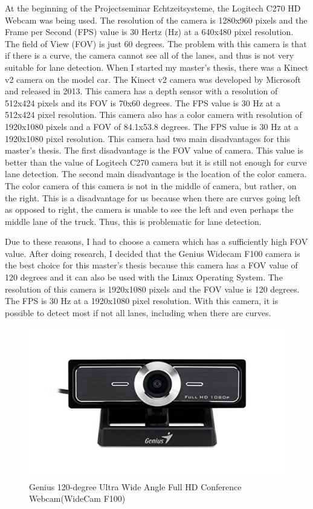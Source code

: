 At the beginning of the Projectseminar Echtzeitsysteme, the Logitech C270 HD Webcam was being used. The resolution of 
the camera is 1280x960 pixels and the Frame per Second (FPS) value is 30 Hertz (Hz) at a 640x480 pixel resolution. 
The field of View (FOV) is just 60 degrees. The problem with this camera is that if there is a curve, the camera 
cannot see all of the lanes, and thus is not very suitable for lane detection. When I started my master's thesis, there 
was a Kinect v2 camera on the model car.  The Kinect v2 camera was developed by Microsoft and released in 2013. This 
camera has a depth sensor with a resolution of 512x424 pixels and its FOV is 70x60 degrees. The FPS value is 30 Hz at 
a 512x424 pixel resolution. This camera also has a color camera with resolution of 1920x1080 pixels and a FOV of 
84.1x53.8 degrees. The FPS value is 30 Hz at a 1920x1080 pixel resolution. This camera had two main disadvantages for 
this master's thesis. The first disadvantage is the FOV value of camera. This value is better than the value of Logitech 
C270 camera but it is still not enough for curve lane detection. The second main disadvantage is the location of the 
color camera. The color camera of this camera is not in the middle of camera, but rather, on the right. This is a 
disadvantage for us because when there are curves going left as opposed to right, the camera is unable to see the 
left and even perhaps the middle lane of the truck. Thus, this is problematic for lane detection.

Due to these reasons, I had to choose a camera which has a sufficiently high FOV value. After doing research, I decided 
that the Genius Widecam F100 camera is the best choice for this master's thesis because this camera has a FOV value of 
120 degrees and it can also be used with the Linux Operating System. The resolution of this camera is 1920x1080 pixels 
and the FOV value is 120 degrees. The FPS is 30 Hz at a 1920x1080 pixel resolution. With this camera, it is possible 
to detect most if not all lanes, including when there are curves. 

\begin{figure}[H]
	\centering
	\hspace*{0cm}   
	\includegraphics[width=150mm,scale=1]{./Bilder/Genius_F100_camera.png}
	\caption{Genius 120-degree Ultra Wide Angle Full HD Conference Webcam(WideCam F100) }
\end{figure}


